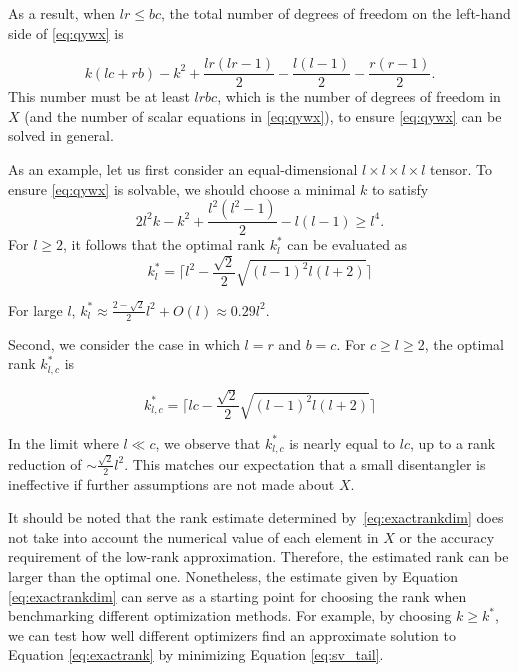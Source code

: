 \documentclass[pdflatex,sn-mathphys-num]{sn-jnl}
\begin{document}
As a result, when $lr \leq bc$, the total number of degrees of freedom on the left-hand side of \eqref{eq:qywx} is 

\begin{equation}
k(lc + rb) - k^2 + \frac{lr(lr-1)}{2} - \frac{l(l-1)}{2} - \frac{r(r-1)}{2}. 
\label{eq:exactrankdim}
\end{equation}
This number must be at least $lrbc$, which is the number of degrees of freedom in $X$ (and the number of scalar equations in \eqref{eq:qywx}), to ensure \eqref{eq:qywx} can be solved in general.

As an example, let us first consider 
an equal-dimensional $l\times l\times l\times l$ tensor.
To ensure \eqref{eq:qywx} is solvable, we should choose a minimal $k$ to satisfy
\begin{equation}
2l^2k - k^2 + \frac{l^2(l^2-1)}{2} - l(l-1) \geq l^4.
\end{equation}
For $ l \geq 2$, it follows that the optimal rank $k_l^*$ can be evaluated as
\begin{equation}
k^*_l = \lceil l^2 - \frac{\sqrt{2}}{2}\sqrt{(l-1)^2l(l+2)}\rceil
\label{eq:exactrankn}
\end{equation}

For large $l$, $k^*_l \approx \frac{2 - \sqrt{2}}{2} l^2 + O(l) \approx 0.29l^2$. 

Second, we consider the case in which $l=r$ and $b=c$. For $c\geq l \geq 2$, the optimal rank $k^*_{l,c}$ is 

\begin{equation}
k^*_{l,c} = \lceil lc - \frac{\sqrt{2}}{2}\sqrt{(l-1)^2l(l+2)}\rceil
\label{eq:exactrankmn}
\end{equation}

In the limit where $l \ll c$, we observe that $k^*_{l,c}$ is nearly equal to  $lc$, up to a rank reduction of $\sim \frac{\sqrt{2}}{2} l^2$. This matches our expectation that a small disentangler is ineffective if further assumptions are not made about $X$. 

It should be noted that the rank estimate determined by~\eqref{eq:exactrankdim} does not take into account the numerical value of each element in $X$ or the accuracy requirement of the low-rank approximation. Therefore, the estimated rank can be larger than the optimal one.
Nonetheless, the estimate given by Equation \ref{eq:exactrankdim} can serve as a starting point for choosing the rank when benchmarking different optimization methods. For example, by choosing $k \geq k^*$, we can test how well different optimizers find an approximate solution to Equation \ref{eq:exactrank} by minimizing Equation \ref{eq:sv_tail}. 
\end{document}
